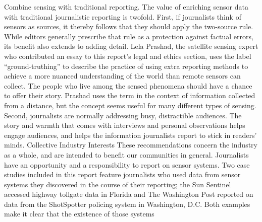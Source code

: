 \begin{itemize}
Combine sensing with traditional reporting.
The value of enriching sensor data with traditional journalistic reporting
is twofold. First, if journalists think of sensors as sources, it thereby follows
that they should apply the two-source rule. While editors generally
prescribe that rule as a protection against factual errors, its benefit also
extends to adding detail. Lela Prashad, the satellite sensing expert who
contributed an essay to this report's legal and ethics section, uses the label
``ground-truthing'' to describe the practice of using extra reporting methods
to achieve a more nuanced understanding of the world than remote sensors
can collect. The people who live among the sensed phenomena should have
a chance to offer their story. Prashad uses the term in the context of information
collected from a distance, but the concept seems useful for many
different types of sensing.
Second, journalists are normally addressing busy, distractible audiences.
The story and warmth that comes with interviews and personal observations
helps engage audiences, and helps the information journalists report
to stick in readers' minds.
Collective Industry Interests
These recommendations concern the industry as a whole, and are intended
to benefit our communities in general.
Journalists have an opportunity and a responsibility to report on
sensor systems.
Two case studies included in this report feature journalists who used data
from sensor systems they discovered in the course of their reporting; the
Sun Sentinel accessed highway tollgate data in Florida and The Washington
Post reported on data from the ShotSpotter policing system in Washington,
D.C. Both examples make it clear that the existence of those systems


\end{itemize}
